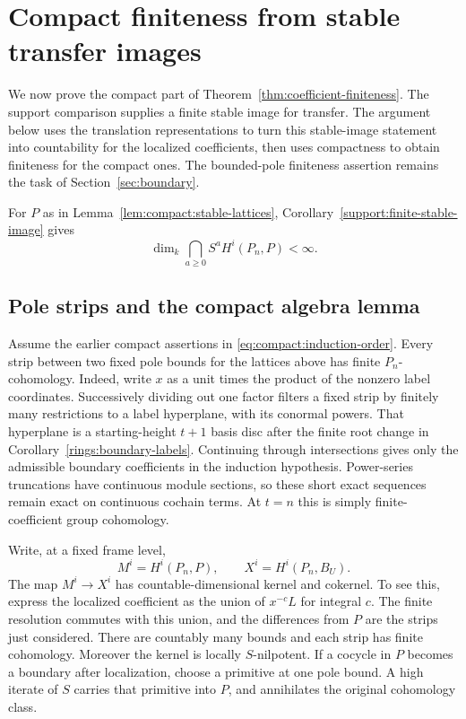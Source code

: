 \section{Compact finiteness from stable transfer images}
\label{sec:compact}

We now prove the compact part of Theorem~\ref{thm:coefficient-finiteness}.
The support comparison supplies a finite stable image for transfer.
The argument below uses the translation representations to turn this
stable-image statement into countability for the localized coefficients,
then uses compactness to obtain finiteness for the compact ones.
The bounded-pole finiteness assertion remains the task of
Section~\ref{sec:boundary}.

For $P$ as in Lemma~\ref{lem:compact:stable-lattices},
Corollary~\ref{support:finite-stable-image} gives
\begin{equation}\label{eq:compact:finite-stable-part}
 \dim_k\bigcap_{a\geq0}S^aH^i(P_n,P)<\infty.
\end{equation}

\subsection{Pole strips and the compact algebra lemma}

Assume the earlier compact assertions in
\eqref{eq:compact:induction-order}.  Every strip between two fixed pole
bounds for the lattices above has finite $P_n$-cohomology.  Indeed, write
$x$ as a unit times the product of the nonzero label coordinates.
Successively dividing out one factor filters a fixed strip by finitely
many restrictions to a label hyperplane, with its conormal powers.
That hyperplane is a starting-height $t+1$ basis disc after the finite
root change in Corollary~\ref{rings:boundary-labels}.  Continuing through
intersections gives only the admissible boundary coefficients in the
induction hypothesis.  Power-series truncations have continuous module
sections, so these short exact sequences remain exact on continuous
cochain terms.  At $t=n$ this is simply finite-coefficient group
cohomology.

Write, at a fixed frame level,
\[
             M^i=H^i(P_n,P),\qquad X^i=H^i(P_n,B_U).
\]
The map $M^i\to X^i$ has countable-dimensional kernel and cokernel.
To see this, express the localized coefficient as the union of
$x^{-c}L$ for integral $c$.  The finite resolution commutes with this
union, and the differences from $P$ are the strips just considered.
There are countably many bounds and each strip has finite cohomology.
Moreover the kernel is locally $S$-nilpotent.  If a cocycle in $P$
becomes a boundary after localization, choose a primitive at one pole
bound.  A high iterate of $S$ carries that primitive into $P$, and
annihilates the original cohomology class.

